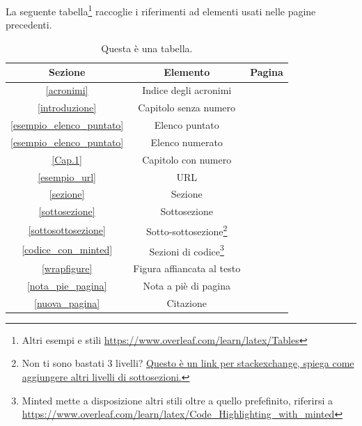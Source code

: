 \documentclass[envcountsame,envcountchap]{svmono}
\begin{document}
La seguente tabella\footnote{Altri esempi e stili \url{https://www.overleaf.com/learn/latex/Tables}} raccoglie i riferimenti ad elementi usati nelle pagine precedenti.

\begin{table}[h!]
    \centering
    \begin{tabular}{||c | c | c||} 
        \hline
        Sezione & Elemento & Pagina \\ [0.5ex] 
        \hline\hline
        \ref{acronimi} & Indice degli acronimi & \pageref{acronimi} \\ 
        \ref{introduzione} & Capitolo senza numero & \pageref{introduzione} \\
        \ref{esempio_elenco_puntato} & Elenco puntato & \pageref{esempio_elenco_puntato} \\
        \ref{esempio_elenco_puntato} & Elenco numerato & \pageref{esempio_elenco_puntato} \\
        \ref{Cap.1} & Capitolo con numero & \pageref{Cap.1} \\
        \ref{esempio_url} & URL & \pageref{esempio_url} \\
        \ref{sezione} & Sezione & \pageref{sezione} \\
        \ref{sottosezione} & Sottosezione & \pageref{sottosezione} \\
        \ref{sottosottosezione} & Sotto-sottosezione\footnote{Non ti sono bastati 3 livelli? \href{https://tex.stackexchange.com/questions/60209/how-to-add-an-extra-level-of-sections-with-headings-below-subsubsection}{Questo è un link per stackexchange, spiega come aggiungere altri livelli di sottosezioni.}} & \pageref{sottosottosezione} \\
        \ref{codice_con_minted} & Sezioni di codice\footnote{Minted mette a disposizione altri stili oltre a quello prefefinito, riferirsi a \url{https://www.overleaf.com/learn/latex/Code_Highlighting_with_minted}} & \pageref{codice_con_minted} \\
        \ref{wrapfigure} & Figura affiancata al testo & \pageref{wrapfigure} \\
        \ref{nota_pie_pagina} & Nota a piè di pagina & \pageref{nota_pie_pagina} \\
        \ref{nuova_pagina} & Citazione & \pageref{nuova_pagina} \\ [1ex] 
        \hline
    \end{tabular}
    \caption{Questa è una tabella.}
    \label{tabella_esempi}
\end{table}
\end{document}
